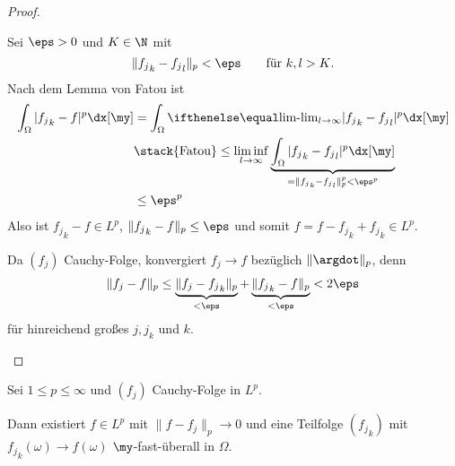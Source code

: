 \begin{st}
\begin{proof}
\begin{seg}[$1 \le p < \infty$]
\begin{enumerate}[a)]
					Sei $\eps > 0$ und $K \in \N$ mit
					\[
						\|{f_j}_k - {f_j}_l \|_p < \eps  \qquad \text{für $k,l > K$.}
					\]
					Nach dem Lemma von Fatou ist
					\begin{align*}
						\int_{\Omega} |{f_j}_k - f|^p \dx[\my]
						&= \int_{\Omega} \lim_{l\to \infty} |{f_j}_k - {f_j}_l |^p \dx[\my] \\
						&\stack{\text{Fatou}}\le \liminf_{l\to \infty} \underbrace{\int_{\Omega} |{f_j}_k - {f_j}_l |^p \dx[\my]}_{= \|{f_j}_k - {f_j}_l\|_p^p < \eps^p} \\
						&\le \eps^p
					\end{align*}
					Also ist ${f_j}_k - f \in L^p$, $\|{f_j}_k - f\|_p \le \eps$ und somit $f = f - {f_j}_k + {f_j}_k \in L^p$.

					Da $(f_j)$ Cauchy-Folge, konvergiert $f_j \to f$ bezüglich $\|\argdot\|_p$, denn
					\[
						\|f_j - f\|_p 
						\le \underbrace{\|f_j - {f_j}_k \|_p}_{< \eps} + \underbrace{\|{f_j}_k - f\|_p}_{< \eps}
						< 2 \eps
					\]
					für hinreichend großes $j, j_k$ und $k$.
			\end{enumerate}
		\end{seg}
	\end{proof}
\end{st}
\setcounter{thm}{13}
\begin{kor}[Weyl] \label{2.14}
	Sei $1 \le p \le \infty$ und $(f_j)$ Cauchy-Folge in $L^p$.
	
	Dann existiert $f \in L^p$ mit $\|f - f_j\|_p \to 0$ und eine Teilfolge $({f_j}_k)$ mit ${f_j}_k(\omega) \to f(\omega)$ $\my$-fast-überall in $\Omega$.
\end{kor}

